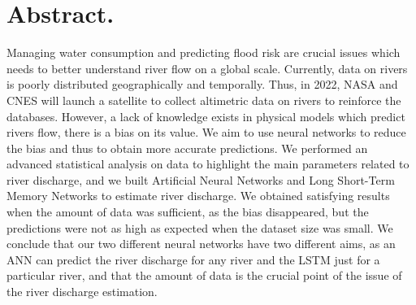 \section*{Abstract.}

Managing water consumption and predicting flood risk are crucial issues which needs to better understand river flow on a global scale. Currently, data on rivers is poorly distributed geographically and temporally. Thus, in 2022, NASA and CNES will launch a satellite to collect altimetric data on rivers to reinforce the databases. However, a lack of knowledge exists in physical models which predict rivers flow, there is a bias on its value. We aim to use neural networks to reduce the bias and thus to obtain more accurate predictions. We performed an advanced statistical analysis on data to highlight the main parameters related to river discharge, and we built Artificial Neural Networks and Long Short-Term Memory Networks to estimate river discharge. We obtained satisfying results when the amount of data was sufficient, as the bias disappeared, but the predictions were not as high as expected when the dataset size was small. We conclude that our two different neural networks have two different aims, as an ANN can predict the river discharge for any river and the LSTM just for a particular river, and that the amount of data is the crucial point of the issue of the river discharge estimation.


